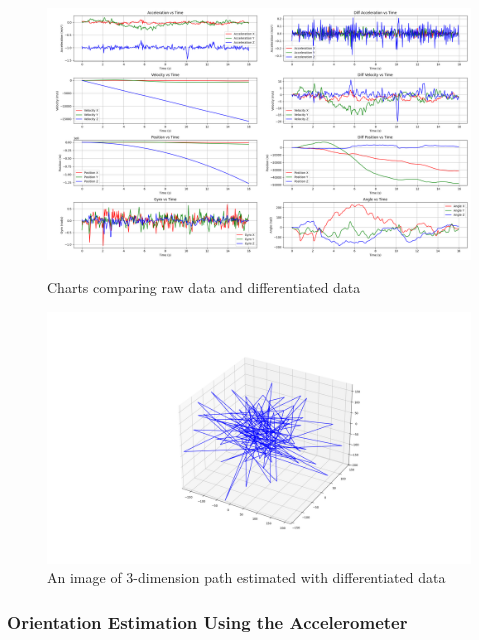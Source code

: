 \documentclass{article}
\begin{document}
\FloatBarrier
\begin{figure}
    \centering
    \includegraphics[width=\textwidth]{Images/data_difference_and_integration.png}
    \caption{Charts comparing raw data and differentiated data}
    \label{fig:data_difference_and_integration}
    \centering
    \includegraphics[width=\textwidth]{Images/error_3d_path.png}
    \caption{An image of 3-dimension path estimated with differentiated data}
    \label{fig:error_3d_path}
\end{figure}

\FloatBarrier
\subsubsection{Orientation Estimation Using the Accelerometer}
\end{document}
